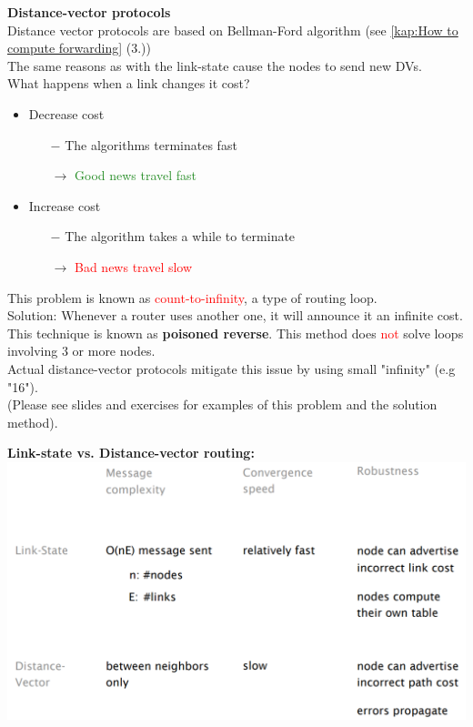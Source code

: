 \documentclass[a4paper, fontsize=8pt, landscape, DIV=1]{scrartcl}
\begin{document}
\begin{multicols*}{4}
		\textbf{Distance-vector protocols}\\
		Distance vector protocols are based on Bellman-Ford algorithm (see \ref{kap:How to compute forwarding} (3.))\\
		The same reasons as with the link-state cause the nodes to send new DVs.\\
		What happens when a link changes it cost?
		\vspace{-0.2cm}
		\begin{itemize}[noitemsep]
			\item Decrease cost
			\begin{itemize}
				\item[$-$] The algorithms terminates fast
				\item[$\rightarrow$] \textcolor{ForestGreen}{Good news travel fast}
			\end{itemize}
			\item Increase cost
			\begin{itemize}
				\item[$-$] The algorithm takes a while to terminate
				\item[$\rightarrow$] \textcolor{Red}{Bad news travel slow}
			\end{itemize}
		\end{itemize}
		This problem is known as \textcolor{Red}{count-to-infinity}, a type of routing loop.\\
		Solution: Whenever a router uses another one, it will announce it an infinite cost. This technique is known as \textbf{poisoned reverse}. This method does \textcolor{Red}{not} solve loops involving 3 or more nodes.\\
		Actual distance-vector protocols mitigate this issue by using small "infinity" (e.g "16").\\
		(Please see slides and exercises for examples of this problem and the solution method).\par
		
		\textbf{Link-state vs. Distance-vector routing:}
		\includegraphics[width=\columnwidth]{images/Network_Layer/state_vs_vector.png}
		 

\end{multicols*}
\end{document}

